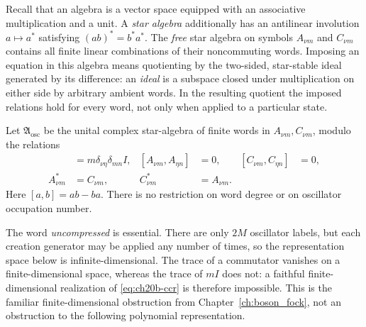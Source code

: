 Recall that an algebra is a vector space equipped with an associative
multiplication and a unit.  A \emph{star algebra} additionally has an
antilinear involution \(a\mapsto a^*\) satisfying
\((ab)^*=b^*a^*\).  The \emph{free} star algebra on symbols \(A_{\nu m}\)
and \(C_{\nu m}\) contains all finite linear combinations of their
noncommuting words.  Imposing an equation in this algebra means quotienting
by the two-sided, star-stable ideal generated by its difference: an
\emph{ideal} is a subspace closed under multiplication on either side by
arbitrary ambient words.  In the resulting quotient the imposed
relations hold for every word, not only when applied to a particular state.

\begin{definition}
\label{def:ch20b-ccr}
Let \(\mathfrak A_{\mathrm{osc}}\) be the unital complex star-algebra
of finite words in \(A_{\nu m},C_{\nu m}\), modulo the relations
\begin{align}
 [A_{\nu m},C_{\eta n}]&=m\delta_{\nu\eta}\delta_{mn}I,
 & [A_{\nu m},A_{\eta n}]&=0,
 & [C_{\nu m},C_{\eta n}]&=0,
 \label{eq:ch20b-ccr}\\
 A_{\nu m}^*&=C_{\nu m},& C_{\nu m}^*&=A_{\nu m}.
 \nonumber
\end{align}
Here \([a,b]=ab-ba\).  There is no restriction on word degree or on
oscillator occupation number.
\end{definition}

The word \emph{uncompressed} is essential.  There are only \(2M\)
oscillator labels, but each creation generator may be applied any number
of times, so the representation space below is infinite-dimensional.
The trace of a commutator vanishes on a finite-dimensional space, whereas
the trace of \(mI\) does not: a faithful finite-dimensional realization of
\eqref{eq:ch20b-ccr} is therefore impossible.  This is the familiar
finite-dimensional obstruction from Chapter~\ref{ch:boson_fock}, not an
obstruction to the following polynomial representation.

